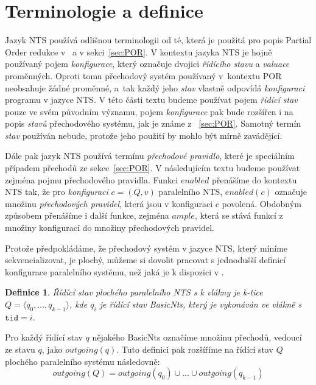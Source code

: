 \documentclass[12pt]{fithesis2}
\newtheorem{definition}{Definice}
\newcommand{\tuple}[1]{\langle #1 \rangle}
\begin{document}
\section{Terminologie a definice}
Jazyk NTS používá odlišnou terminologii od té, která je použitá pro popis Partial Order redukce v~\cite{CLARKE} a v sekci~\ref{sec:POR}. V kontextu jazyka NTS je hojně používaný pojem \textit{konfigurace}, který označuje dvojici \textit{řídícího stavu} a \textit{valuace} proměnných. Oproti tomu přechodový systém používaný v~kontextu POR neobsahuje žádné proměnné, a~tak každý jeho \textit{stav} vlastně odpovídá \textit{konfiguraci} programu v jazyce NTS. V této části textu budeme používat pojem \textit{řídící stav} pouze ve svém původním významu, pojem \textit{konfigurace} pak bude rozšířen i na popis \textit{stavů} přechodového systému, jak je známe z ~\ref{sec:POR}. Samotný termín \textit{stav} používán nebude, protože jeho použití by mohlo být mírně zavádějící.

Dále pak jazyk NTS používá termínu \textit{přechodové pravidlo}, které je speciálním případem přechodů ze sekce~\ref{sec:POR}. V následujícím textu budeme používat zejména pojmu přechodového pravidla. Funkci $\mathit{enabled}$ přenášíme do kontextu NTS tak, že pro \textit{konfiguraci} $c=(Q, v)$ paralelního NTS, $\mathit{enabled}(c)$ označuje množinu \textit{přechodových pravidel}, která jsou v konfiguraci $c$ povolená. Obdobným způsobem přenášíme i další funkce, zejména $\mathit{ample}$, která se stává funkcí z množiny konfigurací do množiny přechodových pravidel.

Protože předpokládáme, že přechodový systém v jazyce NTS, který míníme sekvencializovat, je plochý, můžeme si dovolit pracovat s jednodušší definicí konfigurace paralelního systému, než jaká je k dispozici v \cite{NTSref}.
\begin{definition}
Řídící stav plochého paralelního NTS s k vlákny je k-tice $Q = \tuple{q_0, \ldots, q_{k-1}}$, kde $q_i$ je řídící stav BasicNts, který je vykonáván ve vlákně s $\texttt{tid} = i$.
\end{definition}

Pro každý řídící stav $q$ nějakého BasicNts označíme množinu přechodů, vedoucí ze stavu $q$, jako $\mathit{outgoing}(q)$. Tuto definici pak rozšíříme na řídící stav $Q$ plochého paralelního systému následovně:
\begin{equation}
\mathit{outgoing}(Q) = \mathit{outgoing}(q_0) \cup \ldots \cup \mathit{outgoing}(q_{k-1})
\end{equation}
\end{document}
